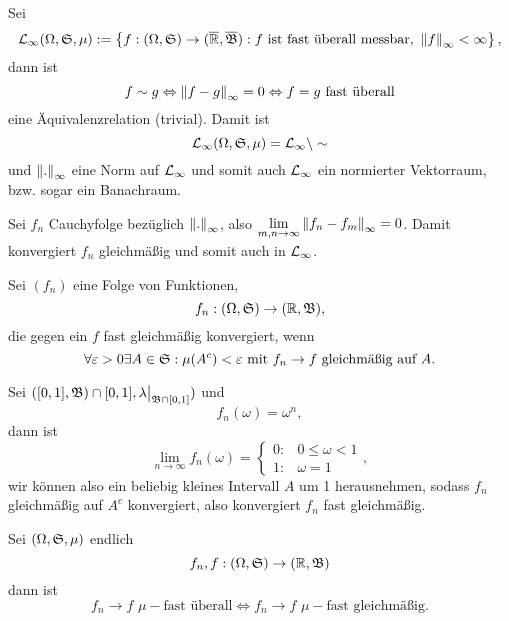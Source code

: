			\begin{defi}
				Sei
				\[ \mathcal{L}_\infty(\Omega,\mathfrak{S},\mu):=\left\{f:(\Omega,\mathfrak{S})\to(\overline{\mathbb{R}},\overline{\mathfrak{B}}): f\text{ ist fast überall messbar, }\left\|f\right\|_\infty<\infty\right\}, \]
				dann ist 
				\[ f\sim g\Leftrightarrow\left\|f-g\right\|_\infty=0\Leftrightarrow f=g\text{ fast überall} \]
				eine Äquivalenzrelation (trivial).  Damit ist 
				\[\mathcal{L}_\infty(\Omega,\mathfrak{S},\mu)=\mathcal{L}_\infty\setminus\sim \]
				und $\left\|.\right\|_\infty$ eine Norm auf $\mathcal{L}_\infty$ und somit auch $\mathcal{L}_\infty$ ein normierter Vektorraum, bzw. sogar ein Banachraum. 
			\end{defi}
			
			\begin{bew}
				Sei $f_n$ Cauchyfolge bezüglich $\left\|.\right\|_\infty$, also $\lim\limits_{m,n\to\infty}\left\|f_n-f_m\right\|_\infty=0$. Damit konvergiert $f_n$ gleichmäßig und somit auch in $\mathcal{L}_\infty$. 
			\end{bew}
			
			\begin{defi}
				Sei $(f_n)$ eine Folge von Funktionen,
				\[ f_n:(\Omega,\mathfrak{S})\to(\mathbb{R},\mathfrak{B}), \]
				die gegen ein $f$ fast gleichmäßig konvergiert, wenn 
				\[ \forall \varepsilon>0\exists A\in\mathfrak{S}: \mu(A^c)<\varepsilon \text{ mit } f_n\to f\text{ gleichmäßig auf }A. \]
			\end{defi}
			
			\begin{bsp}
				Sei $([0,1],\mathfrak{B})\cap[0,1],\lambda\big|_{\mathfrak{B}\cap[0,1]})$ und
				\[ f_n(\omega)=\omega^n, \]
				dann ist
				\[ \lim_{n\to\infty}f_n(\omega)=\left\{\begin{array}{ll}
				0:&0\le\omega<1\\1:&\omega=1
				\end{array}\right., \]
				wir können also ein beliebig kleines Intervall $A$ um 1 herausnehmen, sodass $f_n$ gleichmäßig auf $A^c$ konvergiert, also konvergiert $f_n$ fast gleichmäßig. 
			\end{bsp}
			
			\begin{satz}
				Sei $(\Omega,\mathfrak{S},\mu)$ endlich
				\[ f_n,f:(\Omega,\mathfrak{S})\to(\mathbb{R},\mathfrak{B}) \]
				dann ist
				\[ f_n\to f\,\,\mu-\text{fast überall}\Leftrightarrow f_n\to f\,\,\mu-\text{fast gleichmäßig.} \]
			\end{satz}
			
